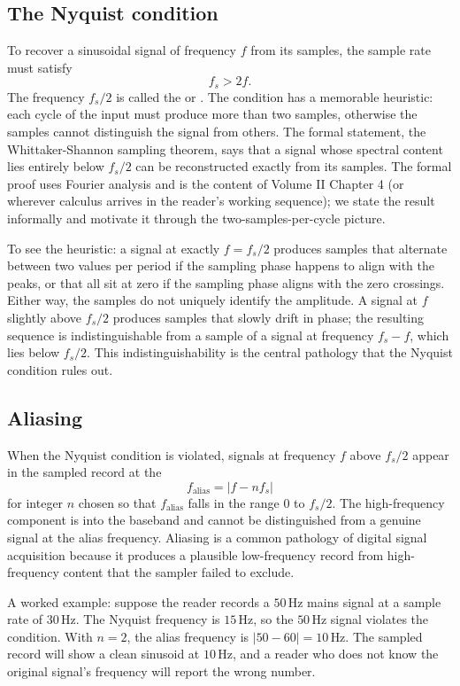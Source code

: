 \subsection{The Nyquist condition}

To recover a sinusoidal signal of frequency $f$ from its samples,
the sample rate must satisfy
\[
f_{s} > 2f.
\]
The frequency $f_{s}/2$ is called the  or
. The condition has a memorable
heuristic: each cycle of the input must produce more than two
samples, otherwise the samples cannot distinguish the signal from
others. The formal statement, the Whittaker-Shannon sampling
theorem, says that a signal whose spectral content lies entirely
below $f_{s}/2$ can be reconstructed exactly from its samples. The
formal proof uses Fourier analysis and is the content of Volume II
Chapter 4 (or wherever calculus arrives in the reader's working
sequence); we state the result informally and motivate it through
the two-samples-per-cycle picture.

To see the heuristic: a signal at exactly $f = f_{s}/2$ produces
samples that alternate between two values per period if the
sampling phase happens to align with the peaks, or that all sit at
zero if the sampling phase aligns with the zero crossings. Either
way, the samples do not uniquely identify the amplitude. A signal
at $f$ slightly above $f_{s}/2$ produces samples that slowly drift
in phase; the resulting sequence is indistinguishable from a sample
of a signal at frequency $f_{s} - f$, which lies below $f_{s}/2$.
This indistinguishability is the central pathology that the
Nyquist condition rules out.

\subsection{Aliasing}

When the Nyquist condition is violated, signals at frequency $f$
above $f_{s}/2$ appear in the sampled record at the
\[
f_{\text{alias}} = | f - n f_{s} |
\]
for integer $n$ chosen so that $f_{\text{alias}}$ falls in the
range $0$ to $f_{s}/2$. The high-frequency component is
 into the baseband and cannot be distinguished
from a genuine signal at the alias frequency. Aliasing is a common pathology of digital signal
acquisition because it produces a plausible low-frequency record
from high-frequency content that the sampler failed to exclude.

A worked example: suppose the reader records a $50 \,\si{\hertz}$
mains signal at a sample rate of $30 \,\si{\hertz}$. The Nyquist
frequency is $15 \,\si{\hertz}$, so the $50 \,\si{\hertz}$ signal
violates the condition. With $n = 2$, the alias frequency is
$|50 - 60| = 10 \,\si{\hertz}$. The sampled record will show a
clean sinusoid at $10 \,\si{\hertz}$, and a reader who does not
know the original signal's frequency will report the wrong number.

